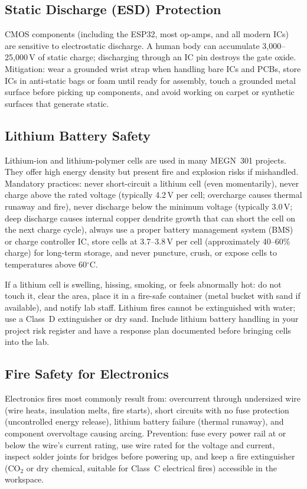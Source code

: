 \documentclass[11pt,letterpaper,twoside,openany]{book}
\newcommand{\degC}{\ensuremath{{}^{\circ}\text{C}}}
\begin{document}
\subsection{Static Discharge (ESD) Protection}
CMOS components (including the ESP32, most op-amps, and all modern ICs) are sensitive to electrostatic discharge. A human body can accumulate 3,000--25,000\,V of static charge; discharging through an IC pin destroys the gate oxide. Mitigation: wear a grounded wrist strap when handling bare ICs and PCBs, store ICs in anti-static bags or foam until ready for assembly, touch a grounded metal surface before picking up components, and avoid working on carpet or synthetic surfaces that generate static.

\subsection{Lithium Battery Safety}
Lithium-ion and lithium-polymer cells are used in many MEGN~301 projects. They offer high energy density but present fire and explosion risks if mishandled. Mandatory practices: never short-circuit a lithium cell (even momentarily), never charge above the rated voltage (typically 4.2\,V per cell; overcharge causes thermal runaway and fire), never discharge below the minimum voltage (typically 3.0\,V; deep discharge causes internal copper dendrite growth that can short the cell on the next charge cycle), always use a proper battery management system (BMS) or charge controller IC, store cells at 3.7--3.8\,V per cell (approximately 40--60\% charge) for long-term storage, and never puncture, crush, or expose cells to temperatures above 60\degC{}.

\begin{warningbox}
If a lithium cell is swelling, hissing, smoking, or feels abnormally hot: do not touch it, clear the area, place it in a fire-safe container (metal bucket with sand if available), and notify lab staff. Lithium fires cannot be extinguished with water; use a Class~D extinguisher or dry sand. Include lithium battery handling in your project risk register and have a response plan documented before bringing cells into the lab.
\end{warningbox}

\subsection{Fire Safety for Electronics}
Electronics fires most commonly result from: overcurrent through undersized wire (wire heats, insulation melts, fire starts), short circuits with no fuse protection (uncontrolled energy release), lithium battery failure (thermal runaway), and component overvoltage causing arcing. Prevention: fuse every power rail at or below the wire's current rating, use wire rated for the voltage and current, inspect solder joints for bridges before powering up, and keep a fire extinguisher (CO$_2$ or dry chemical, suitable for Class~C electrical fires) accessible in the workspace.
\end{document}

